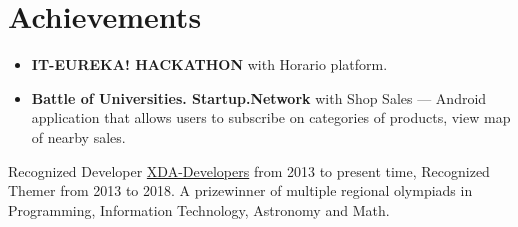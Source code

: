 \documentclass[a4paper]{article}
\begin{document}
	\section*{Achievements}
	\begin{itemize}
		\item \textbf{IT-EUREKA! HACKATHON} with Horario platform.
		\item \textbf{Battle of Universities. Startup.Network} with Shop Sales --- Android application that allows users to subscribe on categories of products, view map of nearby sales.
	\end{itemize}
	Recognized Developer \href{https://forum.xda-developers.com/member.php?u=3685328}{XDA-Developers} from 2013 to present time, Recognized Themer from 2013 to 2018.
	A prizewinner of multiple regional olympiads in Programming, Information Technology, Astronomy and Math.
\end{document}
